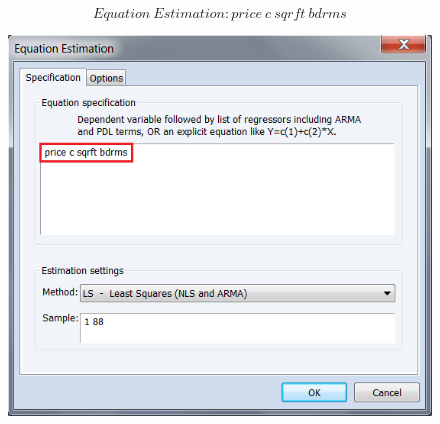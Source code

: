 \documentclass[12pt]{report}
\begin{document}
\vspace{-\baselineskip}
$$Equation\ Estimation: price\ c\ sqrft\ bdrms$$
\begin{figure}[H]
	\centering
	\includegraphics{q3_1}
\end{figure}
\vspace{-\baselineskip}
\end{document}
